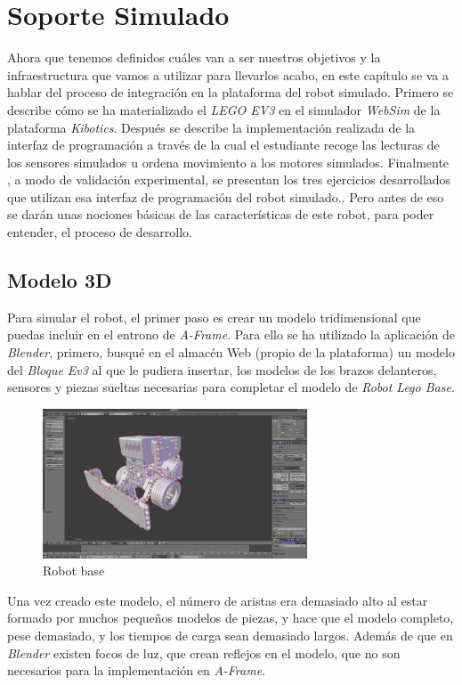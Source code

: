 \chapter{Soporte Simulado}
\label{chap:simulado}
Ahora que tenemos definidos cuáles van a ser nuestros objetivos y la infraestructura que vamos a utilizar para llevarlos acabo, en este capítulo se va a hablar del proceso de integración en la plataforma del robot simulado. Primero se describe cómo se ha materializado el \textit{LEGO EV3} en el simulador \textit{WebSim} de la plataforma \textit{Kibotics}. Después se describe la implementación realizada de la interfaz de programación a través de la cual el estudiante recoge las lecturas de los sensores simulados u ordena movimiento a los motores simulados. Finalmente , a modo de validación experimental, se presentan los tres ejercicios desarrollados que utilizan esa interfaz de programación del robot simulado.. Pero antes de eso se darán unas nociones básicas de las características de este robot, para poder entender, el proceso de desarrollo. 
\section{Modelo 3D}
\label{sec:Modelo}
Para simular el robot, el primer paso es crear un modelo tridimensional que puedas incluir en el entrono de \textit{A-Frame}. Para ello se ha utilizado la aplicación de \textit{Blender}, primero, busqué en el almacén Web (propio de la plataforma) un modelo del \textit{Bloque Ev3} al que le pudiera insertar, los modelos de los brazos delanteros, sensores y piezas sueltas necesarias para completar el modelo de \textit{Robot Lego Base}.

 \begin{figure}[H]
    \centering
    \includegraphics[width=0.7\textwidth]{img/primermodelo.png}
    \caption{Robot base} \label{fig:primer}
\end{figure}

Una vez creado este modelo, el número de aristas era demasiado alto al estar formado por muchos pequeños modelos de piezas, y hace que el modelo completo, pese demasiado, y los tiempos de carga sean demasiado largos. Además de que en \textit{Blender} existen focos de luz, que crean reflejos en el modelo, que no son necesarios para la implementación en \textit{A-Frame}. \newline

